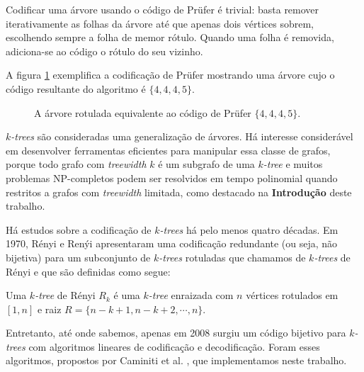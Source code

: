Codificar uma árvore usando o código de Prüfer é trivial: basta remover iterativamente as folhas da árvore até que apenas dois vértices sobrem, escolhendo sempre a folha de memor rótulo. Quando uma folha é removida, adiciona-se ao código o rótulo do seu vizinho.

A figura \ref{fig:prufer} exemplifica a codificação de Prüfer mostrando uma árvore cujo o código resultante do algoritmo é $\{4, 4, 4, 5\}$.

\begin{figure}
  \centering

  \caption{A árvore rotulada equivalente ao código de Prüfer $\{4, 4, 4, 5\}$.}
  \label{fig:prufer}
\end{figure}

\vspace{2em}

\emph{$k$-trees} \cite{harary} são consideradas uma generalização de árvores. Há interesse considerável em desenvolver ferramentas eficientes para manipular essa classe de grafos, porque todo grafo com \emph{treewidth} $k$ é um subgrafo de uma \emph{$k$-tree} e muitos problemas NP-completos podem ser resolvidos em tempo polinomial quando restritos a grafos com \emph{treewidth} limitada, como destacado na \textbf{Introdução} deste trabalho.

Há estudos sobre a codificação de \emph{$k$-trees} há pelo menos quatro décadas. Em 1970, Rényi e Renýi apresentaram uma codificação redundante (ou seja, não bijetiva) para um subconjunto de \emph{$k$-trees} rotuladas que chamamos de \emph{$k$-trees} de Rényi e que são definidas como segue:

\begin{definition}
  \cite{renyi} Uma \emph{$k$-tree} de Rényi $R_k$ é uma \emph{$k$-tree} enraizada com $n$ vértices rotulados em $[1, n]$ e raiz $R = \{n-k+1, n-k+2, \cdots, n\}$.
\end{definition}

Entretanto, até onde sabemos, apenas em 2008 surgiu um código bijetivo para \emph{$k$-trees} com algoritmos lineares de codificação e decodificação. Foram esses algoritmos, propostos por Caminiti et al. \cite{caminiti}, que implementamos neste trabalho.

